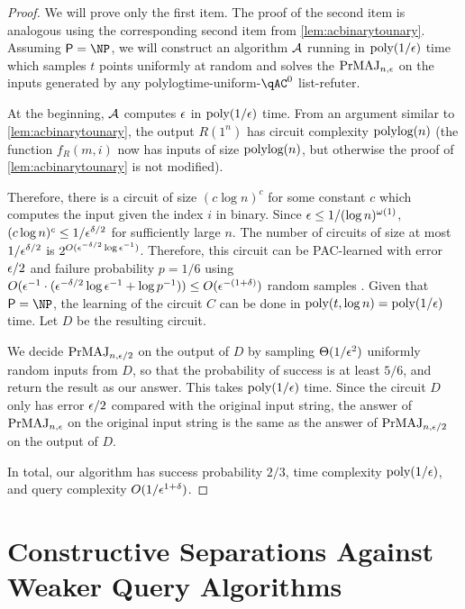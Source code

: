 \begin{proof}
    We will prove only the first item. The proof of the second item is analogous using the 
    corresponding second item from \cref{lem:acbinarytounary}.
    Assuming $\PTIME = \NP$, we will construct an algorithm $\mathcal{A}$ running in $\text{poly}(1/\epsilon)$ time
    which samples $t$ points uniformly at random and solves the $\mathrm{PrMAJ}_{n, \epsilon}$ on the
    inputs generated by any polylogtime-uniform-$\qAC^0$ list-refuter.

    At the beginning, $\mathcal{A}$ computes $\epsilon$ in $\text{poly}(1/\epsilon)$ time. 
    From an argument similar to \cref{lem:acbinarytounary}, the output
    $R(1^n)$ has circuit complexity $\text{polylog}(n)$ (the function $f_R(m, i)$ now has 
    inputs of size $\text{polylog}(n)$, but otherwise the proof of \cref{lem:acbinarytounary}
    is not modified).

    Therefore, there is a circuit of size $(c \log n)^c$ for some constant $c$ which computes
    the input given the index $i$ in binary. Since $\epsilon \leq 1/(\log n)^{\omega(1)}$,
    $(c \log n)^c \leq 1/\epsilon^{\delta/2}$ for sufficiently large $n$. 
    The number of circuits of size at most $1/\epsilon^{\delta/2}$ is $2^{O(\epsilon^{-\delta/2} \log \epsilon^{-1})}$.
    Therefore, this circuit can be PAC-learned with error $\epsilon/2$ and failure probability 
    $p = 1/6$ using $O(\epsilon^{-1} \cdot (\epsilon^{-\delta/2} \log \epsilon^{-1} + \log p^{-1})) \leq O(\epsilon^{-(1+\delta)})$
    random samples \cite[Theorem 2.5]{Mohri18}. Given that $\PTIME = \NP$, the learning of the circuit 
    $C$ can be done in $\text{poly}(t, \log n) = \text{poly}(1/\epsilon)$ time. Let $D$ be the resulting circuit.

    We decide $\mathrm{PrMAJ}_{n, \epsilon/2}$ on the output of $D$ by sampling $\Theta(1/\epsilon^2)$ uniformly random
    inputs from $D$, so that the probability of success is at least $5/6$, and return the result 
    as our answer. This takes $\text{poly}(1/\epsilon)$ time. 
    Since the circuit $D$ only has error $\epsilon/2$ 
    compared with the original input string, the answer of $\mathrm{PrMAJ}_{n, \epsilon}$ on the original input
    string is the same as the answer of $\mathrm{PrMAJ}_{n, \epsilon/2}$ on the output of $D$.
    
    In total, our algorithm has success probability $2/3$, time complexity $\text{poly}(1/\epsilon)$, and 
    query complexity $O(1/\epsilon^{1+\delta})$. 
\end{proof}

\section{Constructive Separations Against Weaker Query Algorithms}
\label{sec:refuteragainstweakerqa}

